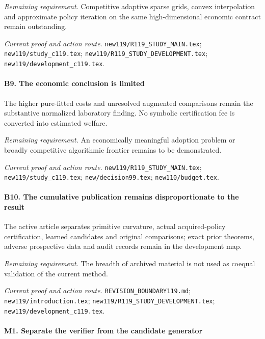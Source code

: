 \par\emph{Remaining requirement.} Competitive adaptive sparse grids, convex interpolation and approximate policy iteration on the same high-dimensional economic contract remain outstanding.

\par\emph{Current proof and action route.} \nolinkurl{new119/R119_STUDY_MAIN.tex}; \nolinkurl{new119/study_c119.tex}; \nolinkurl{new119/R119_STUDY_DEVELOPMENT.tex}; \nolinkurl{new119/development_c119.tex}.

\paragraph{B9. The economic conclusion is limited}

The higher pure-fitted costs and unresolved augmented comparisons remain the substantive normalized laboratory finding. No symbolic certification fee is converted into estimated welfare.

\par\emph{Remaining requirement.} An economically meaningful adoption problem or broadly competitive algorithmic frontier remains to be demonstrated.

\par\emph{Current proof and action route.} \nolinkurl{new119/R119_STUDY_MAIN.tex}; \nolinkurl{new119/study_c119.tex}; \nolinkurl{new/decision99.tex}; \nolinkurl{new110/budget.tex}.

\paragraph{B10. The cumulative publication remains disproportionate to the result}

The active article separates primitive curvature, actual acquired-policy certification, learned candidates and original comparisons; exact prior theorems, adverse prospective data and audit records remain in the development map.

\par\emph{Remaining requirement.} The breadth of archived material is not used as coequal validation of the current method.

\par\emph{Current proof and action route.} \nolinkurl{REVISION_BOUNDARY119.md}; \nolinkurl{new119/introduction.tex}; \nolinkurl{new119/R119_STUDY_DEVELOPMENT.tex}; \nolinkurl{new119/development_c119.tex}.

\paragraph{M1. Separate the verifier from the candidate generator}

